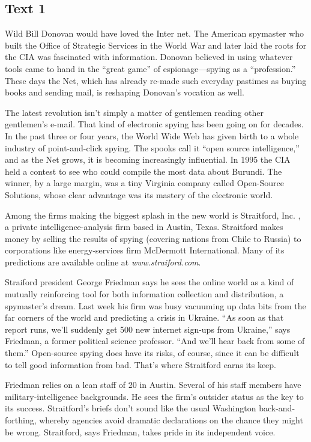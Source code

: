 \newpage
\subsection{Text 1}


Wild Bill Donovan would have loved the Inter net. The American spymaster
who built the Office of Strategic Services in the World War  and later
laid the roots for the CIA was fascinated with information. Donovan
believed in using whatever tools came to hand in the ``great game'' of
espionage---spying as a ``profession.'' These days the Net, which has
already re-made such everyday pastimes as buying books and sending mail,
is reshaping Donovan's vocation as well.

The latest revolution isn't simply a matter of gentlemen reading other
gentlemen's e-mail. That kind of electronic spying has been going on for
decades. In the past three or four years, the World Wide Web has given
birth to a whole industry of point-and-click spying. The spooks call it
``open source intelligence,'' and as the Net grows, it is becoming
increasingly influential. In 1995 the CIA held a contest to see who
could compile the most data about Burundi. The winner, by a large
margin, was a tiny Virginia company called Open-Source Solutions, whose
clear advantage was its mastery of the electronic world.

Among the firms making the biggest splash in the new world is
Straitford, Inc. , a private intelligence-analysis firm based in Austin,
Texas. Straitford makes money by selling the results of spying (covering
nations from Chile to Russia) to corporations like energy-services firm
McDermott International. Many of its predictions are available online at \emph{www.straiford.com}.

Straiford president George Friedman says he sees the online world as a
kind of mutually reinforcing tool for both information collection and
distribution, a spymaster's dream. Last week his firm was busy vacuuming
up data bits from the far corners of the world and predicting a crisis
in Ukraine. ``As soon as that report runs, we'll suddenly get 500 new
internet sign-ups from Ukraine,'' says Friedman, a former political
science professor. ``And we'll hear back from some of them.''
Open-source spying does have its risks, of course, since it can be
difficult to tell good information from bad. That's where Straitford
earns its keep.

Friedman relies on a lean staff of 20 in Austin. Several of his staff
members have military-intelligence backgrounds. He sees the firm's
outsider status as the key to its success. Straitford's briefs don't
sound like the usual Washington back-and-forthing, whereby agencies
avoid dramatic declarations on the chance they might be wrong.
Straitford, says Friedman, takes pride in its independent voice.



